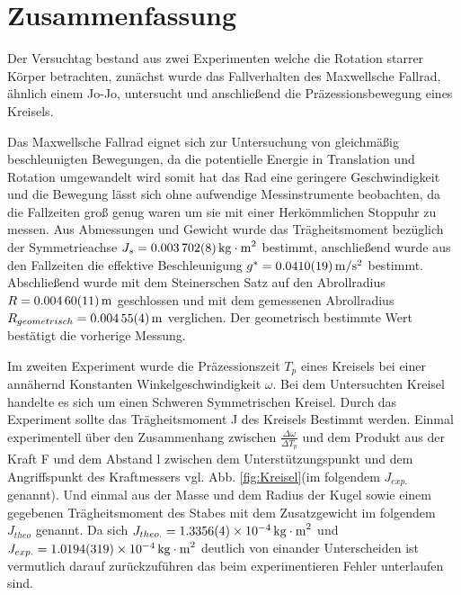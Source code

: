 
\section{Zusammenfassung}\label{kap:Zusammenfassung}

Der Versuchtag bestand aus zwei Experimenten welche die Rotation starrer Körper betrachten, zunächst wurde das Fallverhalten des Maxwellsche Fallrad, ähnlich einem Jo-Jo, untersucht und anschließend die Präzessionsbewegung eines Kreisels. 





Das Maxwellsche Fallrad eignet sich zur Untersuchung von gleichmäßig beschleunigten Bewegungen, da die potentielle Energie in Translation und Rotation umgewandelt wird somit hat das Rad eine geringere Geschwindigkeit und die Bewegung lässt sich ohne aufwendige Messinstrumente beobachten, da die Fallzeiten groß genug waren um sie mit einer Herkömmlichen Stoppuhr zu messen.
Aus Abmessungen und Gewicht wurde das Trägheitsmoment bezüglich der Symmetrieachse $J_s=\SI{0.003702 \pm 0.000008}{kg\cdot m^2}$ bestimmt, anschließend wurde aus den Fallzeiten die effektive Beschleunigung  $g^*=\SI{0.0410 \pm  0.0019}{m \per s \squared}$ bestimmt. Abschließend wurde mit dem Steinerschen Satz auf den Abrollradius $R=\SI{0.00460\pm 0.00011}{m}$ geschlossen und mit dem gemessenen Abrollradius $R_{geometrisch}=\SI{0.00455 \pm 0.00004}{m}$ verglichen. Der geometrisch bestimmte Wert bestätigt die vorherige Messung. 






 


Im zweiten Experiment wurde die Präzessionszeit $T_p$ eines Kreisels bei einer annähernd Konstanten Winkelgeschwindigkeit $\omega$. Bei dem Untersuchten Kreisel handelte es sich um einen Schweren Symmetrischen Kreisel.
Durch das Experiment sollte das Trägheitsmoment J des Kreisels Bestimmt werden. Einmal experimentell über den Zusammenhang zwischen $\frac{\Delta \omega}{\Delta T_p}$ und dem Produkt aus der Kraft F und dem Abstand l zwischen dem Unterstützungspunkt und dem Angriffspunkt des Kraftmessers vgl. Abb. \ref{fig:Kreisel}(im folgendem $J_{exp.}$ genannt). Und einmal aus der Masse und dem Radius der Kugel sowie einem gegebenen Trägheitsmoment des Stabes mit dem Zusatzgewicht im folgendem $J_{theo}$ genannt. Da sich $J_{theo.}=\SI{1,3356+-0,0004e-4}{kg \cdot m^2}$ und $J_{exp.}=\SI{1,0194+-0,0319e-4}{kg \cdot m^2}$ deutlich von einander Unterscheiden ist vermutlich darauf zurückzuführen das beim experimentieren Fehler unterlaufen sind.  
 










